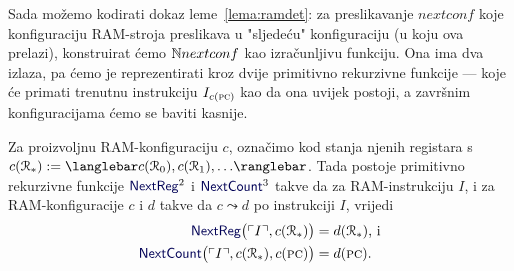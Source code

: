 Sada možemo kodirati dokaz leme~\ref{lema:ramdet}: za preslikavanje $nextconf$ koje konfiguraciju RAM-stroja preslikava u "sljedeću" konfiguraciju (u koju ova prelazi), konstruirat ćemo ${\mathbb N} nextconf$ kao izračunljivu funkciju. Ona ima dva izlaza, pa ćemo je reprezentirati kroz dvije primitivno rekurzivne funkcije --- koje će primati trenutnu instrukciju $I_{c(\textsc{pc})}$ kao da ona uvijek postoji, a završnim konfiguracijama ćemo se baviti kasnije.

\begin{lema}[{name=[primitivna rekurzivnost prijelaza između RAM-konfiguracija]}]\label{lm:NextRegCountprn}
Za proizvoljnu RAM-konfiguraciju $c$, označimo kod stanja njenih registara s $c(\reg{*}):=\knk{c(\reg0),c(\reg1),\dotsc}$. Tada postoje primitivno rekurzivne funkcije $\f{NextReg}^2$ i $\f{NextCount}^3$ takve da za RAM-instrukciju $I$, i za RAM-kon\-fi\-gu\-ra\-ci\-je $c$ i $d$ takve da $c\leadsto d$ po instrukciji $I$, vrijedi
\begin{align}
    \f{NextReg}\bigl(\kins{I},c(\reg{*})\bigr)&=d(\reg{*})\text{, i}\\
    \f{NextCount}\bigl(\kins{I},c(\reg{*}),c(\textsc{pc})\bigr)&=d(\textsc{pc})\text.
\end{align}
\end{lema}

